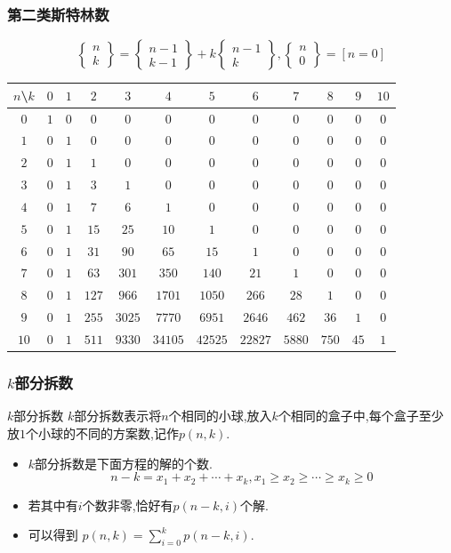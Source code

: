 \documentclass{beamer}
\newcommand{\pau}{}
\begin{document}
\begin{frame}[fragile]
    \frametitle{第二类斯特林数}
    $$\begin{Bmatrix}n\\k\end{Bmatrix}=\begin{Bmatrix}n-1\\k-1\end{Bmatrix}+k\begin{Bmatrix}n-1\\k\end{Bmatrix},\begin{Bmatrix}n\\0\end{Bmatrix}=[n=0]$$
	\begin{center}
		\footnotesize
		\begin{tabular}{c|ccccccccccc}
			$n$\textbackslash$k$&$0$&$1$&$2$&$3$&$4$&$5$&$6$&$7$&$8$&$9$&$10$\\\hline
			$0$&$1$&$0$&$0$&$0$&$0$&$0$&$0$&$0$&$0$&$0$&$0$\\
			$1$&$0$&$1$&$0$&$0$&$0$&$0$&$0$&$0$&$0$&$0$&$0$\\
			$2$&$0$&$1$&$1$&$0$&$0$&$0$&$0$&$0$&$0$&$0$&$0$\\
			$3$&$0$&$1$&$3$&$1$&$0$&$0$&$0$&$0$&$0$&$0$&$0$\\
			$4$&$0$&$1$&$7$&$6$&$1$&$0$&$0$&$0$&$0$&$0$&$0$\\
			$5$&$0$&$1$&$15$&$25$&$10$&$1$&$0$&$0$&$0$&$0$&$0$\\
			$6$&$0$&$1$&$31$&$90$&$65$&$15$&$1$&$0$&$0$&$0$&$0$\\
			$7$&$0$&$1$&$63$&$301$&$350$&$140$&$21$&$1$&$0$&$0$&$0$\\
			$8$&$0$&$1$&$127$&$966$&$1701$&$1050$&$266$&$28$&$1$&$0$&$0$\\
			$9$&$0$&$1$&$255$&$3025$&$7770$&$6951$&$2646$&$462$&$36$&$1$&$0$\\
			$10$&$0$&$1$&$511$&$9330$&$34105$&$42525$&$22827$&$5880$&$750$&$45$&$1$\\
		\end{tabular}
	\end{center}
\end{frame}

\begin{frame}[fragile]
    \frametitle{$k$部分拆数}
    \begin{block}{$k$部分拆数}
        $k$部分拆数表示将$n$个相同的小球,放入$k$个相同的盒子中,每个盒子至少放$1$个小球的不同的方案数,记作$p(n,k)$.
    \end{block}\pau
    \begin{itemize}
    	\item $k$部分拆数是下面方程的解的个数.$$n-k=x_1+x_2+\cdots+x_k,x_1\geq x_2\geq\cdots\geq x_k\geq0$$\pau
    	\item 若其中有$i$个数非零,恰好有$p(n-k,i)$个解.\pau
    	\item 可以得到 $p(n,k)=\sum\limits_{i=0}^kp(n-k,i)$.
    \end{itemize}
\end{frame}
\end{document}
